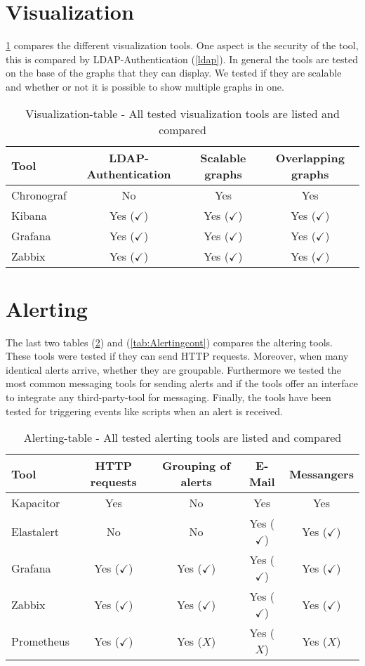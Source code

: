 \section{Visualization}
\cref{tab:Visualization} compares the different visualization tools. One aspect is the security of the tool, this is compared by LDAP-Authentication (\cref{ldap}). In general the tools are tested on the base of the graphs that they can display. We tested if they are scalable and whether or not it is possible to show multiple graphs in one. 
\begin{table}[H] 
\centering
\begin{tabular}{lccc}
	\hline
Tool & LDAP-Authentication         & Scalable graphs             & Overlapping graphs          \\
\hline
Chronograf & No & Yes & Yes \\
Kibana & Yes ($ \checkmark $) & Yes ($ \checkmark $) & Yes ($ \checkmark $)\\
Grafana & Yes ($ \checkmark $) & Yes ($ \checkmark $) & Yes ($ \checkmark $)\\
Zabbix & Yes ($ \checkmark $) & Yes ($ \checkmark $)  & Yes  ($ \checkmark $)\\
\hline
\end{tabular}
\caption{Visualization-table - All tested visualization tools are listed and compared}
\label{tab:Visualization}
\end{table}

\section{Alerting}
The last two tables (\cref{tab:Alerting}) and (\cref{tab:Alertingcont}) compares the altering tools. These tools were tested if they can send HTTP requests. Moreover, when many identical alerts arrive, whether they are groupable. Furthermore we tested the most common messaging tools for sending alerts and if the tools offer an interface to integrate any third-party-tool for messaging. Finally, the tools have been tested for triggering events like scripts when an alert is received.
\begin{table}[H]
	\centering
	\begin{tabular}{lcccc}
		\hline
Tool & HTTP requests & Grouping of alerts & E-Mail & Messangers \\
\hline
Kapacitor & Yes  & No & Yes & Yes \\
Elastalert & No & No & Yes ($ \checkmark $) & Yes ($ \checkmark $) \\
Grafana & Yes ($ \checkmark $) & Yes ($ \checkmark $) & Yes ($ \checkmark $) & Yes ($ \checkmark $) \\
Zabbix & Yes ($ \checkmark $) & Yes ($ \checkmark $) & Yes ($ \checkmark $) & Yes ($ \checkmark $) \\
Prometheus & Yes ($ \checkmark $) & Yes ($ X $) & Yes ($ X $) & Yes ($ X $)\\
		\hline
	\end{tabular}
	\caption{Alerting-table - All tested alerting tools are listed and compared}
	\label{tab:Alerting}
\end{table}

